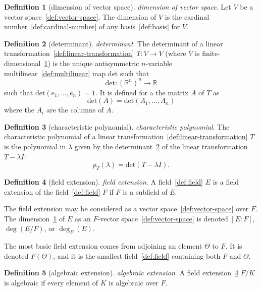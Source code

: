 \documentclass[12pt,a4paper]{article}
\theoremstyle{definition}
\newtheorem{definition}{Definition}
\begin{document}
\begin{definition}[dimension of vector space]\label{def:dimension-of-vector-space}
\emph{dimension of vector space}. Let $V$ be a vector space~\ref{def:vector-space}. The dimension of $V$ is the cardinal number~\ref{def:cardinal-number} of any basis~\ref{def:basis} for $V$.
\end{definition}

\begin{definition}[determinant]\label{def:determinant}
\emph{determinant}. The determinant of a linear transformation~\ref{def:linear-transformation} $T: V\to V$ (where $V$ is finite-dimensional~\ref{def:dimension-of-vector-space}) is the unique antisymmetric $n$-variable multilinear~\ref{def:multilinear} map $\text{det}$ such that $$\text{det}:(\mathbb R^n)^n \to \mathbb R$$ such that $\text{det}(e_1,\dots,e_n)=1$. It is defined for a the matrix $A$ of $T$ as $$\text{det}(A) = \text{det}(A_1,\dots,A_n)$$ where the $A_i$ are the columns of $A$.
\end{definition}

\begin{definition}[characteristic polynomial]\label{def:characteristic-polynomial}
\emph{characteristic polynomial}. The characteristic polynomial of a linear transformation~\ref{def:linear-transformation} $T$ is the polynomial in $\lambda$ given by the determinant~\ref{def:determinant} of the linear transformation $T-\lambda I$: $$p_T(\lambda) = \text{det}(T-\lambda I).$$
\end{definition}

\begin{definition}[field extension]\label{def:field-extension}
\emph{field extension}. A field~\ref{def:field} $E$ is a field extension of the field~\ref{def:field} $F$ if $F$ is a subfield of $E$. 

The field extension may be considered as a vector space~\ref{def:vector-space} over $F$. The dimension~\ref{def:dimension-of-vector-space} of $E$ as an $F$-vector space~\ref{def:vector-space} is denoted $[E:F]$, $\deg(E/F)$, or $\deg_F(E)$.

The most basic field extension comes from adjoining an element $\Theta$ to $F$. It is denoted $F(\Theta)$, and it is the smallest field~\ref{def:field} containing both $F$ and $\Theta$.
\end{definition}

\begin{definition}[algebraic extension]\label{def:algebraic-extension}
\emph{algebraic extension}. A field extension~\ref{def:field-extension} $F/K$ is algebraic if every element of $K$ is algebraic over $F$.
\end{definition}
\end{document}

